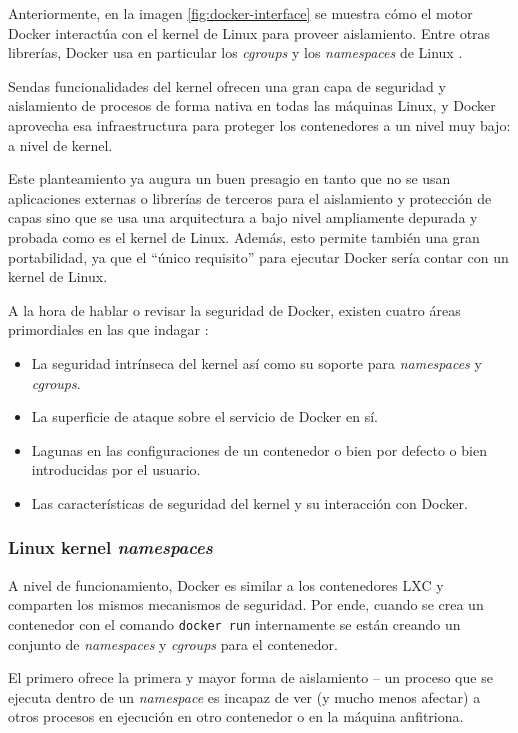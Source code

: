 Anteriormente, en la imagen \ref{fig:docker-interface} se muestra cómo el
motor Docker interactúa con el kernel de Linux para proveer aislamiento. Entre
otras librerías, Docker usa en particular los \textit{cgroups} 
\autocite{Cgroups2021} y los \textit{namespaces} de Linux \autocite{LinuxNamespaces2021}.

Sendas funcionalidades del kernel ofrecen una gran capa de seguridad y aislamiento
de procesos de forma nativa en todas las máquinas Linux, y Docker aprovecha esa
infraestructura para proteger los contenedores a un nivel muy bajo: a nivel de
kernel.

Este planteamiento ya augura un buen presagio en tanto que no se usan aplicaciones
externas o librerías de terceros para el aislamiento y protección de capas sino
que se usa una arquitectura a bajo nivel ampliamente depurada y probada como es
el kernel de Linux. Además, esto permite también una gran portabilidad, ya que
el ``único requisito'' para ejecutar Docker sería contar con un kernel de 
Linux.

A la hora de hablar o revisar la seguridad de Docker, existen cuatro áreas
primordiales en las que indagar \autocite{DockerSecurity2021}:

\begin{itemize}
  \item La seguridad intrínseca del kernel así como su soporte para \textit{namespaces}
        y \textit{cgroups}.
  \item La superficie de ataque sobre el servicio de Docker en sí.
  \item Lagunas en las configuraciones de un contenedor o bien por defecto o bien
        introducidas por el usuario.
  \item Las características de seguridad del kernel y su interacción con Docker.
\end{itemize}

\subsubsection*{Linux kernel \textit{namespaces}}
A nivel de funcionamiento, Docker es similar a los contenedores LXC y comparten
los mismos mecanismos de seguridad. Por ende, cuando se crea un contenedor con el comando
\lstinline[style=bash]!docker run! internamente se están creando un conjunto
de \textit{namespaces} y \textit{cgroups} para el contenedor.

El primero ofrece la primera y mayor forma de aislamiento -- un proceso que se
ejecuta dentro de un \textit{namespace} es incapaz de ver (y mucho menos afectar)
a otros procesos en ejecución en otro contenedor o en la máquina anfitriona.

